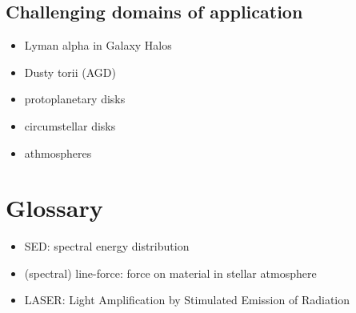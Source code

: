\documentclass[../main/main.tex]{subfiles}
\begin{document}
\subsection{Challenging domains of application}
\begin{itemize}
\item Lyman alpha in Galaxy Halos
\item Dusty torii (AGD)
\item protoplanetary disks
\item circumstellar disks
\item athmospheres
\end{itemize}


\newpage
\section{Glossary}
\begin{itemize}
\item SED: \hfill spectral energy distribution

\item (spectral) line-force: \hfill force on material in stellar atmosphere

\item LASER: \hfill Light Amplification by Stimulated Emission of Radiation
\end{itemize}
\end{document}
